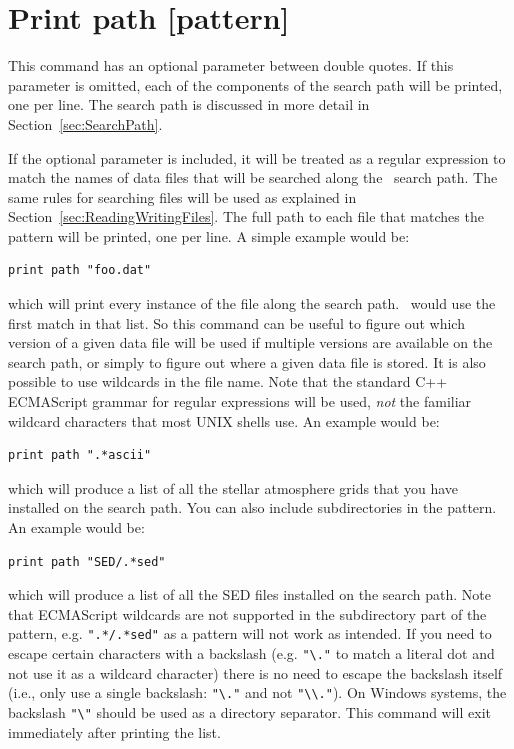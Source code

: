 \section{Print path [pattern]}
\label{sec:PrintPath}

This command has an optional parameter between double quotes. If this
parameter is omitted, each of the components of the search path will be
printed, one per line. The search path is discussed in more detail in
Section~\ref{sec:SearchPath}.

If the optional parameter is included, it will be treated as a regular
expression to match the names of data files that will be searched along the
\Cloudy\ search path. The same rules for searching files will be used as
explained in Section~\ref{sec:ReadingWritingFiles}. The full path to each file
that matches the pattern will be printed, one per line. A simple example would
be:
\begin{verbatim}
print path "foo.dat"
\end{verbatim}
which will print every instance of the file  along the
search path. \Cloudy\ would use the first match in that list. So this command
can be useful to figure out which version of a given data file will be used if
multiple versions are available on the search path, or simply to figure out
where a given data file is stored. It is also possible to use wildcards in the
file name. Note that the standard C++ ECMAScript grammar for regular
expressions will be used, {\em not} the familiar wildcard characters that most
UNIX shells use. An example would be:
\begin{verbatim}
print path ".*ascii"
\end{verbatim}
which will produce a list of all the stellar atmosphere grids that you have
installed on the search path. You can also include subdirectories in the pattern.
An example would be:
\begin{verbatim}
print path "SED/.*sed"
\end{verbatim}
which will produce a list of all the SED files installed on the search path.
Note that ECMAScript wildcards are not supported in the subdirectory part of
the pattern, e.g. \verb!".*/.*sed"! as a pattern will not work as intended. If
you need to escape certain characters with a backslash (e.g. \verb!"\."! to
match a literal dot and not use it as a wildcard character) there is no need
to escape the backslash itself (i.e., only use a single backslash: \verb!"\."!
and not \verb!"\\."!). On Windows systems, the backslash \verb!"\"! should be
used as a directory separator. This command will exit immediately after printing
the list.

